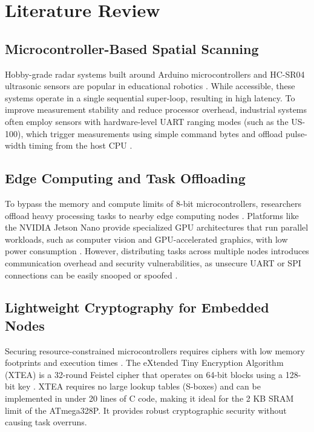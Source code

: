 \documentclass[conference]{IEEEtran}
\begin{document}
\section{Literature Review}
\label{sec:litreview}

\subsection{Microcontroller-Based Spatial Scanning}
Hobby-grade radar systems built around Arduino microcontrollers and HC-SR04 ultrasonic sensors are popular in educational robotics \cite{AlShammari2019, Banzi2011}. While accessible, these systems operate in a single sequential super-loop, resulting in high latency. To improve measurement stability and reduce processor overhead, industrial systems often employ sensors with hardware-level UART ranging modes (such as the US-100), which trigger measurements using simple command bytes and offload pulse-width timing from the host CPU \cite{STMicro2018}.

\subsection{Edge Computing and Task Offloading}
To bypass the memory and compute limits of 8-bit microcontrollers, researchers offload heavy processing tasks to nearby edge computing nodes \cite{Shi2016}. Platforms like the NVIDIA Jetson Nano provide specialized GPU architectures that run parallel workloads, such as computer vision and GPU-accelerated graphics, with low power consumption \cite{Franklin2019}. However, distributing tasks across multiple nodes introduces communication overhead and security vulnerabilities, as unsecure UART or SPI connections can be easily snooped or spoofed \cite{Bettayeb2020}.

\subsection{Lightweight Cryptography for Embedded Nodes}
Securing resource-constrained microcontrollers requires ciphers with low memory footprints and execution times \cite{Beaulieu2015, Dinu2015}. The eXtended Tiny Encryption Algorithm (XTEA) is a 32-round Feistel cipher that operates on 64-bit blocks using a 128-bit key \cite{Wheeler1997}. XTEA requires no large lookup tables (S-boxes) and can be implemented in under 20 lines of C code, making it ideal for the 2 KB SRAM limit of the ATmega328P. It provides robust cryptographic security without causing task overruns.
\end{document}
